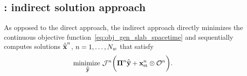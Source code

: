 \subsection{\spaceTimeAcronym: indirect solution approach}
As opposed to the direct approach, the indirect approach directly minimizes the continuous objective function~\eqref{eq:obj_gen_slab_spacetime} and sequentially computes solutions $\hat{\mathbf{\overline{x}}}^{n}$, $n = 1,\ldots,N_w$ that satisfy
\begin{equation}\label{eq:obj_gen_slab2}
\begin{split}
 & \underset{\stgenstatey}{\text{minimize }} \mathcal{J}^n \bigg( \stbasisArgnt{n} \stgenstatey + \stateInterceptSTArg{n} \otimes \onesFunctionArg{n} \bigg) .%
\end{split} 
\end{equation}
